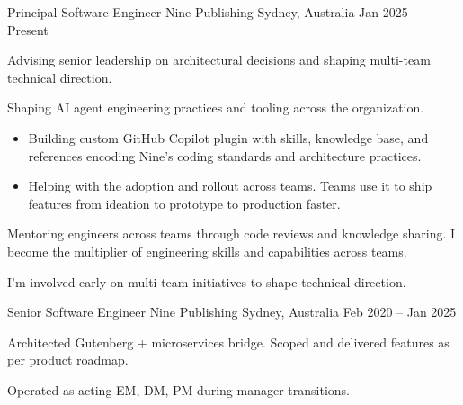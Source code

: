 

\begin{cventries}

  \cventry
    {Principal Software Engineer} %
    {Nine Publishing} %
    {Sydney, Australia} %
    {Jan 2025 -- Present} %
    {
      \begin{cvitems}
        \item {Advising senior leadership on architectural decisions and shaping multi-team technical direction.}
        \item {Shaping AI agent engineering practices and tooling across the organization.}
            \begin{itemize}
                \item {Building custom GitHub Copilot plugin with skills, knowledge base, and references encoding Nine's coding standards and architecture practices.}
                \item {Helping with the adoption and rollout across teams. Teams use it to ship features from ideation to prototype to production faster.}
            \end{itemize}
        \item {Mentoring engineers across teams through code reviews and knowledge sharing. I become the multiplier of engineering skills and capabilities across teams.}
        \item {I'm involved early on multi-team initiatives to shape technical direction.}
      \end{cvitems}
    }

  \cventry
    {Senior Software Engineer} %
    {Nine Publishing} %
    {Sydney, Australia} %
    {Feb 2020 -- Jan 2025} %
    {
      \begin{cvitems}
        \item {Architected Gutenberg + microservices bridge. Scoped and delivered features as per product roadmap.}
        \item {Operated as acting EM, DM, PM during manager transitions.}
      \end{cvitems}
    }


\end{cventries}
